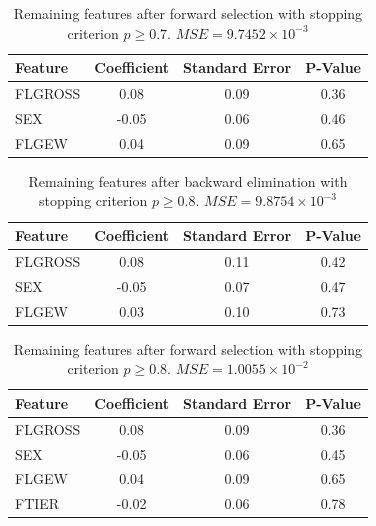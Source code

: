 \documentclass[twoside,twocolumn,10pt]{revtex4-1}
\begin{document}
	\begin{table}[H]
	\center
		\begin{tabular}{l c c c}
		\textbf{Feature} & \textbf{Coefficient}& \textbf{Standard Error} & \textbf{P-Value} \\ 
		\hline
		FLGROSS & 0.08 & 0.09 & 0.36\\
		SEX & -0.05 & 0.06 & 0.46\\
		FLGEW & 0.04 & 0.09 & 0.65
		\end{tabular}
	\caption{Remaining features after forward selection with stopping criterion $p \geq 0.7$. $MSE = 9.7452 \times 10^{-3}$\label{table_4}}
	\end{table}
	
	\begin{table}[H]
	\center
		\begin{tabular}{l c c c}
		\textbf{Feature} & \textbf{Coefficient}& \textbf{Standard Error} & \textbf{P-Value} \\ 
		\hline
		FLGROSS & 0.08 & 0.11 & 0.42\\
		SEX & -0.05 & 0.07 & 0.47\\
		FLGEW & 0.03 & 0.10 & 0.73
		\end{tabular}
	\caption{Remaining features after backward elimination with stopping criterion $p \geq 0.8$. $MSE = 9.8754 \times 10^{-3}$\label{table_5}}
	\end{table}
	
	\begin{table}[H]
	\center
		\begin{tabular}{l c c c}
		\textbf{Feature} & \textbf{Coefficient}& \textbf{Standard Error} & \textbf{P-Value} \\ 
		\hline
		FLGROSS & 0.08 & 0.09 & 0.36\\
		SEX & -0.05 & 0.06 & 0.45\\
		FLGEW & 0.04 & 0.09 & 0.65\\
		FTIER & -0.02 & 0.06 & 0.78
		\end{tabular}
	\caption{Remaining features after forward selection with stopping criterion $p \geq 0.8$. $MSE = 1.0055 \times 10^{-2}$\label{table_6}}
	\end{table}
	
\end{document}
